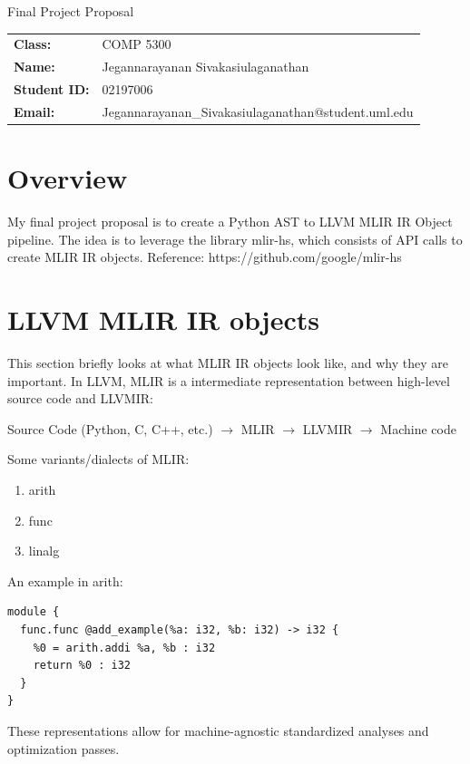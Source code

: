 \documentclass[11pt]{article}
\begin{document}
\begin{center}
    {\LARGE Final Project Proposal}\\[1.5em]
\end{center}

\begin{tabular}{@{}ll@{}}
    \textbf{Class:} & COMP 5300 \\[0.5em]
    \textbf{Name:} & Jegannarayanan Sivakasiulaganathan \\[0.5em]
    \textbf{Student ID:} & 02197006 \\[0.5em]
    \textbf{Email:} & Jegannarayanan\_Sivakasiulaganathan@student.uml.edu
\end{tabular}

\vspace{2em}

\section{Overview}
My final project proposal is to create a Python AST to LLVM MLIR IR Object
pipeline. The idea is to leverage the library mlir-hs, which consists of
API calls to create MLIR IR objects.
Reference:
https://github.com/google/mlir-hs

\section{LLVM MLIR IR objects}
This section briefly looks at what MLIR IR objects look like, and why they are important.
In LLVM, MLIR is a intermediate representation between high-level source code and LLVMIR:

\noindent Source Code (Python, C, C++, etc.) $\to$ MLIR $\to$ LLVMIR $\to$ Machine code

\noindent Some variants/dialects of MLIR:

\begin{enumerate}
    \item arith
    \item func
    \item linalg
\end{enumerate}

\noindent An example in arith:
\begin{verbatim}
module {
  func.func @add_example(%a: i32, %b: i32) -> i32 {
    %0 = arith.addi %a, %b : i32
    return %0 : i32
  }
}
\end{verbatim}

\noindent These representations allow for machine-agnostic standardized analyses and optimization passes.
\end{document}
